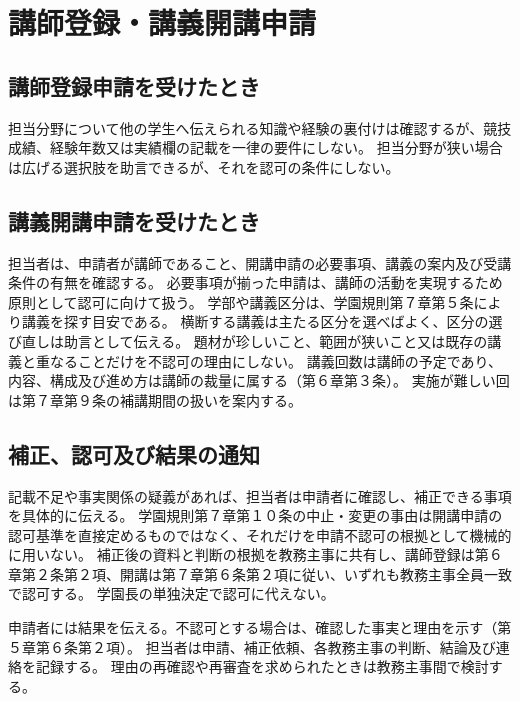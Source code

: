﻿\newpage
\chapter{講師登録・講義開講申請}

\section{講師登録申請を受けたとき}

担当分野について他の学生へ伝えられる知識や経験の裏付けは確認するが、競技成績、経験年数又は実績欄の記載を一律の要件にしない。
担当分野が狭い場合は広げる選択肢を助言できるが、それを認可の条件にしない。

\section{講義開講申請を受けたとき}

担当者は、申請者が講師であること、開講申請の必要事項、講義の案内及び受講条件の有無を確認する。
必要事項が揃った申請は、講師の活動を実現するため原則として認可に向けて扱う。
学部や講義区分は、学園規則第７章第５条により講義を探す目安である。
横断する講義は主たる区分を選べばよく、区分の選び直しは助言として伝える。
題材が珍しいこと、範囲が狭いこと又は既存の講義と重なることだけを不認可の理由にしない。
講義回数は講師の予定であり、内容、構成及び進め方は講師の裁量に属する（第６章第３条）。
実施が難しい回は第７章第９条の補講期間の扱いを案内する。

\section{補正、認可及び結果の通知}

記載不足や事実関係の疑義があれば、担当者は申請者に確認し、補正できる事項を具体的に伝える。
学園規則第７章第１０条の中止・変更の事由は開講申請の認可基準を直接定めるものではなく、それだけを申請不認可の根拠として機械的に用いない。
補正後の資料と判断の根拠を教務主事に共有し、講師登録は第６章第２条第２項、開講は第７章第６条第２項に従い、いずれも教務主事全員一致で認可する。
学園長の単独決定で認可に代えない。

申請者には結果を伝える。不認可とする場合は、確認した事実と理由を示す（第５章第６条第２項）。
担当者は申請、補正依頼、各教務主事の判断、結論及び連絡を記録する。
理由の再確認や再審査を求められたときは教務主事間で検討する。
